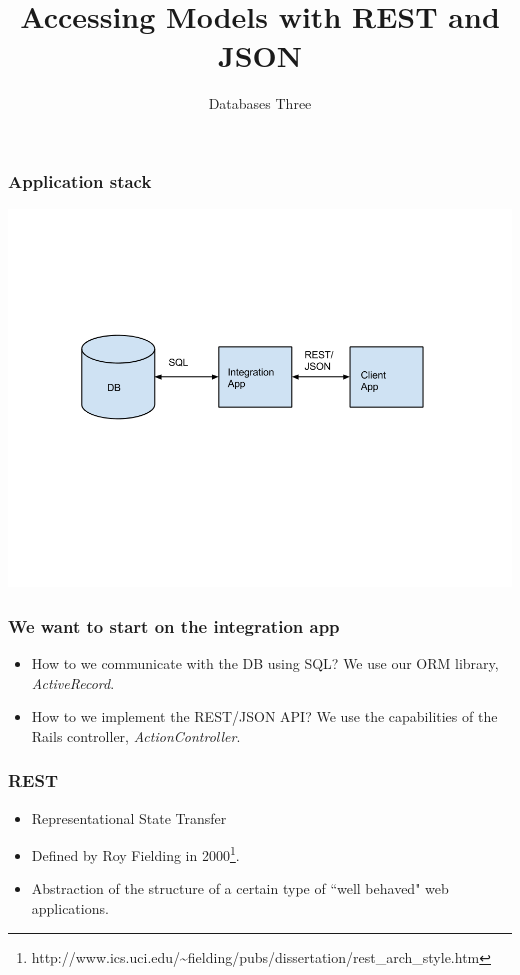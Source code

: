 \documentclass[10pt]{beamer}
\title{Accessing Models with REST and JSON}
\author[IN705]{Databases Three}
\institute[Otago Polytechnic]{
  Otago Polytechnic \\
  Dunedin, New Zealand \\
}
\date{}
\begin{document}
\begin{frame}[plain]
  \titlepage
\end{frame}



\begin{frame}
  \frametitle{Application stack}

   \includegraphics[scale=0.4]{apps.png}


\end{frame}


\begin{frame}
  \frametitle{We want to start on the integration app}

 \begin{itemize}
  \item How to we communicate with the DB using SQL?  We use our ORM
        library, \emph{ActiveRecord}.

  \item How to we implement the REST/JSON API?  We use the capabilities of 
        the Rails controller, \emph{ActionController}.
 \end{itemize}

\end{frame}


\begin{frame}
  \frametitle{REST}

 \begin{itemize}
  \item Representational State Transfer
  \item Defined by Roy Fielding in 2000\footnote{http://www.ics.uci.edu/\textasciitilde{}fielding/pubs/dissertation/rest\_arch\_style.htm}.
  \item Abstraction of the structure of a certain type of ``well behaved" web applications.
 \end{itemize}

\end{frame}
\end{document}

